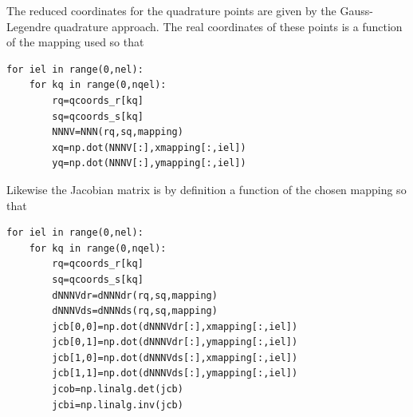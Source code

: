 The reduced coordinates for the quadrature points are given by 
the Gauss-Legendre quadrature approach. The real coordinates of these points
is a function of the mapping used so that 
\begin{lstlisting}
for iel in range(0,nel):
    for kq in range(0,nqel):
        rq=qcoords_r[kq]
        sq=qcoords_s[kq]
        NNNV=NNN(rq,sq,mapping)
        xq=np.dot(NNNV[:],xmapping[:,iel])
        yq=np.dot(NNNV[:],ymapping[:,iel])
\end{lstlisting}
Likewise the Jacobian matrix is by definition a function of the chosen mapping 
so that 
\begin{lstlisting}
for iel in range(0,nel):
    for kq in range(0,nqel):
        rq=qcoords_r[kq]
        sq=qcoords_s[kq]
        dNNNVdr=dNNNdr(rq,sq,mapping)
        dNNNVds=dNNNds(rq,sq,mapping)
        jcb[0,0]=np.dot(dNNNVdr[:],xmapping[:,iel])
        jcb[0,1]=np.dot(dNNNVdr[:],ymapping[:,iel])
        jcb[1,0]=np.dot(dNNNVds[:],xmapping[:,iel])
        jcb[1,1]=np.dot(dNNNVds[:],ymapping[:,iel])
        jcob=np.linalg.det(jcb)
        jcbi=np.linalg.inv(jcb)
\end{lstlisting}


